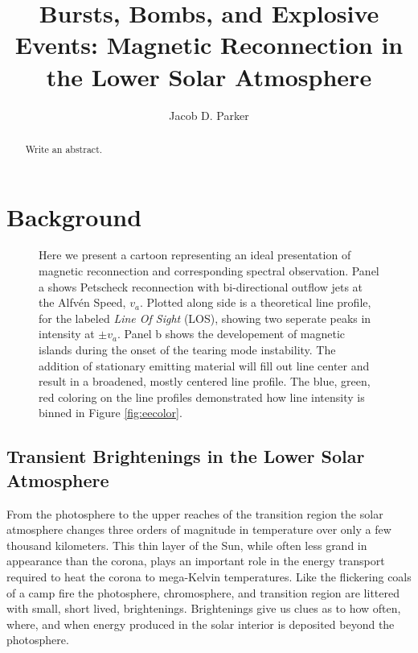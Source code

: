 \documentclass[]{aastex6}
\begin{document}
\title{Bursts, Bombs, and Explosive Events: Magnetic Reconnection in the Lower Solar Atmosphere} 

\author{Jacob D. Parker}





\begin{abstract}
	Write an abstract.

\end{abstract}

\section{Background}

	\begin{figure}
		\label{fig:reconnect}
		\caption{Here we present a cartoon representing an ideal presentation of magnetic reconnection and corresponding spectral observation.  Panel a shows Petscheck reconnection with bi-directional outflow jets at the Alfv\'en Speed, $v_a$.  Plotted along side is a theoretical line profile, for the labeled \textit{Line Of Sight} (LOS), showing two seperate peaks in intensity at $\pm v_a$. Panel b shows the developement of magnetic islands during the onset of the tearing mode instability.  The addition of stationary emitting material will fill out line center and result in a broadened, mostly centered line profile. The blue, green, red coloring on the line profiles demonstrated how line intensity is binned in Figure \ref{fig:eecolor}.}
		
		\centerline{} 
		
	\end{figure}  
	\subsection{Transient Brightenings in the Lower Solar Atmosphere}
	
	
	From the photosphere to the upper reaches of the transition region the solar atmosphere changes three orders of magnitude in temperature over only a few thousand kilometers.  This thin layer of the Sun, while often less grand in appearance than the corona, plays an important role in the energy transport required to heat the corona to mega-Kelvin temperatures.  Like the flickering coals of a camp fire the photosphere, chromosphere, and transition region are littered with small, short lived, brightenings.  Brightenings give us clues as to how often, where, and when energy produced in the solar interior is deposited beyond the photosphere.
	
\end{document}
